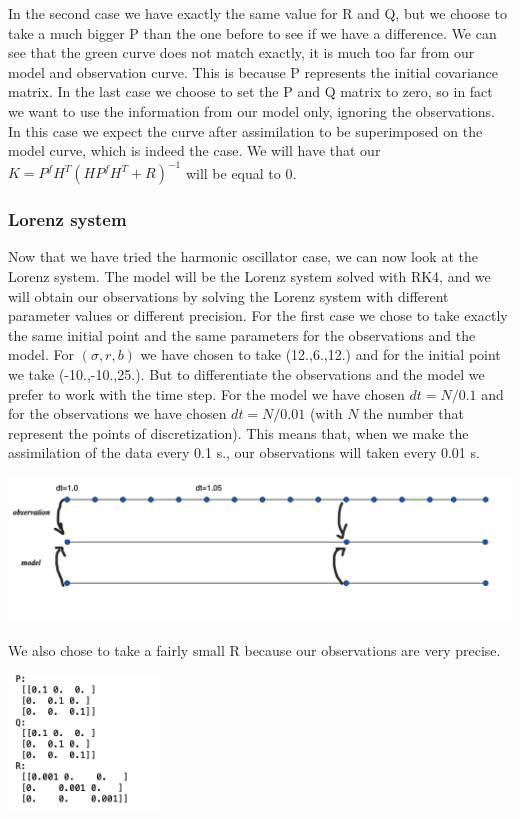 In the second case we have exactly the same value for R and Q, but we choose to take a  much bigger P than the one before to see if we have a difference. We can see that the green curve does not match exactly, it is much too far from our model and observation curve. This is because P represents the initial covariance matrix.
In the last case we choose to set the P and Q matrix to zero, so in fact we want to use the information from our model only, ignoring the observations. In this case we expect the curve after assimilation to be superimposed on the model curve, which is indeed the case. We will have that our $K=P^fH^T(HP^fH^T+R)^{-1}$ will be equal to 0.
\subsubsection{Lorenz system}
Now that we have tried the harmonic oscillator case, we can now look at the Lorenz system. The model will be the Lorenz system solved with RK4, and we will obtain our observations by solving the Lorenz system with different parameter values or different precision.
For the first case we chose to take exactly the same initial point and the same parameters for the observations and the model.
For $(\sigma, r, b)$ we have chosen to take (12.,6.,12.) and for the initial point we take (-10.,-10.,25.). But to differentiate the observations and the model we prefer to work with the time step. For the model we have chosen $dt=N/0.1$ and for the observations we have chosen $dt=N/0.01$ (with $N$ the number that represent the points of discretization). This means that, when we make the assimilation of the data  every 0.1 s., our observations will taken every 0.01 s.
\begin{center}
		\includegraphics[width=1\textwidth]{"images/dt.png"}
\end{center}
We also chose to take a fairly small R because our observations are very precise.

\includegraphics[width=0.3\textwidth]{"images/lorenz1_a.png"}

